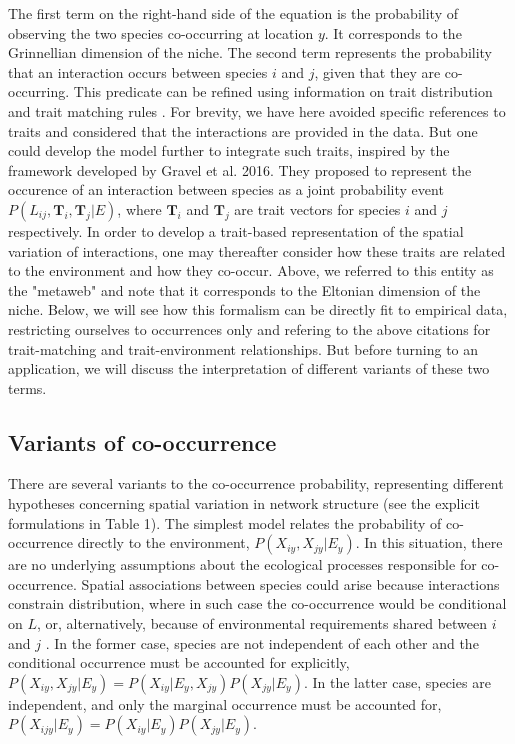 \documentclass[12pt]{article}
\begin{document}
The first term on the right-hand side of the equation is the probability of
observing the two species co-occurring at location $y$. It corresponds to the
Grinnellian dimension of the niche. The second term represents the probability
that an interaction occurs between species $i$ and $j$, given that they are
co-occurring. This predicate can be refined using information on trait
distribution and trait matching rules . For brevity, we have here avoided
specific references to traits and considered that the interactions are
provided in the data. But one could develop the model further to integrate
such traits, inspired by the framework developed by Gravel et al. 2016. They
proposed to represent the occurence of an interaction between species as a
joint probability event $P(L_{ij}, \mathbf{T}_i, \mathbf{T}_j\lvert E)$, where
$\mathbf{T}_i$ and $\mathbf{T}_j$ are trait vectors for species $i$ and $j$
respectively. In order to develop a trait-based representation of the spatial
variation of interactions, one may thereafter consider how these traits are
related to the environment and how they co-occur. Above, we referred to this
entity as the "metaweb" and note that it corresponds to the Eltonian dimension
of the niche. Below, we will see how this formalism can be directly fit to
empirical data, restricting ourselves to occurrences only and refering to the
above citations for trait-matching and trait-environment relationships. But
before turning to an application, we will discuss the interpretation of
different variants of these two terms.

\subsection*{Variants of co-occurrence}

There are several variants to the co-occurrence probability, representing
different hypotheses concerning spatial variation in network structure (see
the explicit formulations in Table 1). The simplest model relates the
probability of co-occurrence directly to the environment,
$P(X_{iy},X_{jy}\lvert E_y)$. In this situation, there are no underlying assumptions
about the ecological processes responsible for co-occurrence. Spatial associations between species could arise
because interactions constrain distribution, where in such case the co-occurrence would be conditional on $L$, or, alternatively, because of
environmental requirements shared between $i$ and $j$ \citep{Pollock2014,
Cazelles2016}. In the former case, species are not independent of each other
and the conditional occurrence must be accounted for explicitly,
$P(X_{iy},X_{jy} \lvert E_y)=P(X_{iy}\lvert E_y,X_{jy})P(X_{jy}\lvert E_y)$. In the latter case,
species are independent, and only the marginal occurrence must be accounted
for, $P( X_{ijy}\lvert E_y)=P(X_{iy} \lvert E_y)P(X_{jy} \lvert E_y)$.
\end{document}
